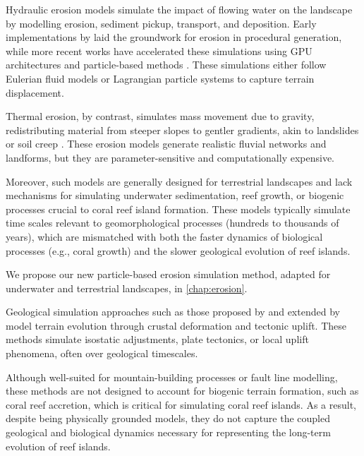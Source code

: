 
Hydraulic erosion models simulate the impact of flowing water on the landscape by modelling erosion, sediment pickup, transport, and deposition. Early implementations by \cite{Musgrave1989} laid the groundwork for erosion in procedural generation, while more recent works have accelerated these simulations using GPU architectures \cite{Mei2007} and particle-based methods \cite{Neidhold2005}. These simulations either follow Eulerian fluid models or Lagrangian particle systems to capture terrain displacement.

Thermal erosion, by contrast, simulates mass movement due to gravity, redistributing material from steeper slopes to gentler gradients, akin to landslides or soil creep \cite{Benes2006}. These erosion models generate realistic fluvial networks and landforms, but they are parameter-sensitive and computationally expensive.

Moreover, such models are generally designed for terrestrial landscapes and lack mechanisms for simulating underwater sedimentation, reef growth, or biogenic processes crucial to coral reef island formation. These models typically simulate time scales relevant to geomorphological processes (hundreds to thousands of years), which are mismatched with both the faster dynamics of biological processes (e.g., coral growth) and the slower geological evolution of reef islands.

We propose our new particle-based erosion simulation method, adapted for underwater and terrestrial landscapes, in \cref{chap:erosion}.


Geological simulation approaches such as those proposed by \cite{Cordonnier2016, Cordonnier2017a} and extended by \cite{Schott2023} model terrain evolution through crustal deformation and tectonic uplift. These methods simulate isostatic adjustments, plate tectonics, or local uplift phenomena, often over geological timescales.

Although well-suited for mountain-building processes or fault line modelling, these methods are not designed to account for biogenic terrain formation, such as coral reef accretion, which is critical for simulating coral reef islands. As a result, despite being physically grounded models, they do not capture the coupled geological and biological dynamics necessary for representing the long-term evolution of reef islands.

